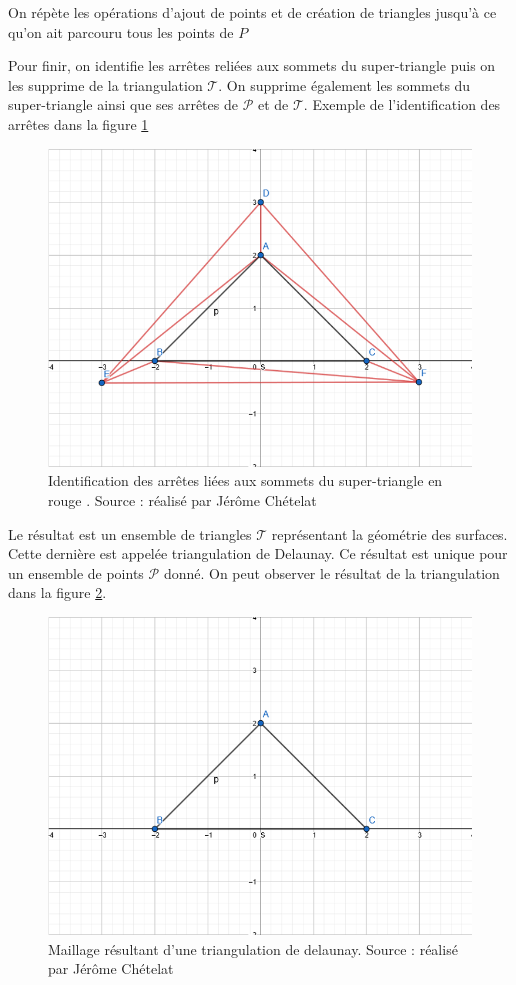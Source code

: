 On répète les opérations d'ajout de points et de création de triangles jusqu'à ce qu'on ait parcouru tous les points de $P$

Pour finir, on identifie les arrêtes reliées aux sommets du super-triangle puis on
les supprime de la triangulation $\mathcal{T}$.
On supprime également les sommets du super-triangle ainsi que ses arrêtes de 
$\mathcal{P}$ et de $\mathcal{T}$. Exemple de l'identification des arrêtes
dans la figure \ref{fig:triangulation_step_9}

\begin{figure}[htbp!]
    \centering
    \includegraphics[width=0.66\linewidth]{figures/bowyer-watson/step_9.png}
    \caption{Identification des arrêtes liées aux sommets du super-triangle en
		rouge . Source : réalisé par
	Jérôme Chételat}
	\label{fig:triangulation_step_9}
\end{figure}

Le résultat est un ensemble de triangles $\mathcal{T}$ représentant la géométrie
des surfaces. Cette dernière est appelée triangulation de Delaunay.
Ce résultat est unique pour un ensemble de points $\mathcal{P}$ donné.
On peut observer le résultat de la triangulation dans la figure \ref{fig:triangulation_step_10}.

\begin{figure}[h!]
    \centering
    \includegraphics[width=0.66\linewidth]{figures/bowyer-watson/step_10.png}
    \caption{Maillage résultant d'une triangulation de delaunay. Source : réalisé par Jérôme Chételat}
	\label{fig:triangulation_step_10}
\end{figure}

